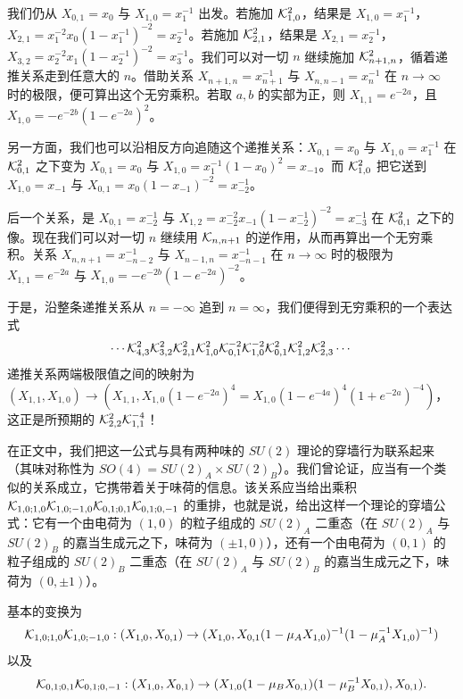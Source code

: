 我们仍从 $X_{0,1}=x_0$ 与 $X_{1,0} = x^{-1}_1$ 出发。若施加 $\mathcal{K}_{1,0}^2$，结果是 $X_{1,0}=x^{-1}_1$，$X_{2,1} = x_1^{-2} x_0 (1- x^{-1}_1)^{-2}=x^{-1}_2$。若施加 $\mathcal{K}_{2,1}^2$，结果是 $X_{2,1}=x^{-1}_2$，$X_{3,2}=x_2^{-2} x_1 (1-x^{-1}_2)^{-2} = x^{-1}_3$。我们可以对一切 $n$ 继续施加 $\mathcal{K}_{n+1,n}^2$，循着递推关系走到任意大的 $n$。借助关系 $X_{n+1,n} = x^{-1}_{n+1}$ 与 $X_{n,n-1} = x^{-1}_{n}$ 在 $n\to\infty$ 时的极限，便可算出这个无穷乘积。若取 $a,b$ 的实部为正，则 $X_{1,1} = e^{-2 a}$，且 $X_{1,0} =- e^{-2 b} (1-e^{-2 a})^2$。

另一方面，我们也可以沿相反方向追随这个递推关系：$X_{0,1}=x_0$ 与 $X_{1,0} =x^{-1}_1$ 在 $\mathcal{K}_{0,1}^2$ 之下变为 $X_{0,1}=x_0$ 与 $X_{1,0} = x^{-1}_1 (1-x_0)^2 = x_{-1}$。而 $\mathcal{K}_{1,0}^2$ 把它送到 $X_{1,0} = x_{-1}$ 与 $X_{0,1} = x_0 (1-x_{-1})^{-2} = x^{-1}_{-2}$。

后一个关系，是 $X_{0,1} = x^{-1}_{-2}$ 与 $X_{1,2} = x_{-2}^{-2} x_{-1} (1-x^{-1}_{-2})^{-2} = x^{-1}_{-3}$ 在 $\mathcal{K}_{0,1}^2$ 之下的像。现在我们可以对一切 $n$ 继续用 $\mathcal{K}_{n,n+1}$ 的逆作用，从而再算出一个无穷乘积。关系 $X_{n,n+1} = x^{-1}_{-n-2}$ 与 $X_{n-1,n} = x^{-1}_{-n-1}$ 在 $n\to\infty$ 时的极限为 $X_{1,1} = e^{-2a}$ 与 $X_{1,0} =- e^{-2 b}(1-e^{-2 a})^{-2}$。

于是，沿整条递推关系从 $n= - \infty$ 追到 $n=\infty$，我们便得到无穷乘积的一个表达式
\begin{equation} \label{eq:appA-infinite-product}
\cdots \mathcal{K}_{4,3}^2 \mathcal{K}_{3,2}^2 \mathcal{K}_{2,1}^2 \mathcal{K}_{1,0}^2 \mathcal{K}_{0,1}^{-2}
\mathcal{K}_{1,0}^{-2} \mathcal{K}_{0,1}^2 \mathcal{K}_{1,2}^2 \mathcal{K}_{2,3}^2 \cdots
\end{equation}
递推关系两端极限值之间的映射为 $(X_{1,1},X_{1,0}) \to (X_{1,1}, X_{1,0}(1-e^{-2 a})^4 = X_{1,0}(1-e^{-4 a})^4 (1+e^{-2 a})^{-4})$，这正是所预期的 $\mathcal{K}_{2,2}^2 \mathcal{K}_{1,1}^{-4}$！

在正文中，我们把这一公式与具有两种味的 $SU(2)$ \SW 理论的穿墙行为联系起来（其味对称性为 $SO(4)=SU(2)_A \times SU(2)_B$）。我们曾论证，应当有一个类似的关系成立，它携带着关于味荷的信息。该关系应当给出乘积 $\mathcal{K}_{1,0;1,0} \mathcal{K}_{1,0;-1,0} \mathcal{K}_{0,1;0,1} \mathcal{K}_{0,1;0,-1}$ 的重排，也就是说，给出这样一个理论的穿墙公式：它有一个由电荷为 $(1,0)$ 的粒子组成的 $SU(2)_A$ 二重态（在 $SU(2)_A$ 与 $SU(2)_B$ 的嘉当生成元之下，味荷为 $(\pm 1,0)$），还有一个由电荷为 $(0,1)$ 的粒子组成的 $SU(2)_B$ 二重态（在 $SU(2)_A$ 与 $SU(2)_B$ 的嘉当生成元之下，味荷为 $(0,\pm 1)$）。

基本的变换为
\begin{equation} \label{eq:appA-flavor-A}
\mathcal{K}_{1,0;1,0} \mathcal{K}_{1,0;-1,0}: (X_{1,0},X_{0,1}) \to (X_{1,0},X_{0,1}(1-
\mu_A X_{1,0})^{-1}(1- \mu_A^{-1} X_{1,0})^{-1})
\end{equation}
以及
\begin{equation} \label{eq:appA-flavor-B}
\mathcal{K}_{0,1;0,1} \mathcal{K}_{0,1;0,-1}: (X_{1,0},X_{0,1}) \to (X_{1,0}(1- \mu_B
X_{0,1})(1- \mu_B^{-1} X_{0,1}),X_{0,1}).
\end{equation}

